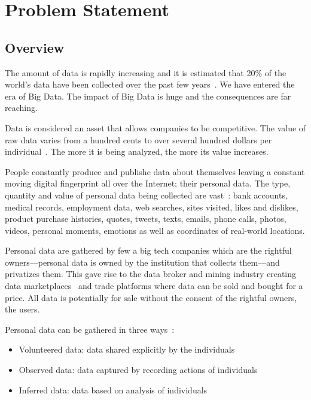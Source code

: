 \chapter{Problem Statement}
\label{problem}

\section{Overview}
\label{problem:overview}

The amount of data is rapidly increasing and it is estimated that 20\% of the world's data have been collected over the past few years~\cite{10.1109/SPW.2015.27,big_data_better_worse}. We have entered the era of Big Data. The impact of Big Data is huge and the consequences are far reaching.

Data is considered an asset that allows companies to be competitive. The value of raw data varies from a hundred cents to over several hundred dollars per individual~\cite{pr_data_cost_1, pr_data_cost_2, pr_data_cost_3}. The more it is being analyzed, the more its value increases.

People constantly produce and publishe data about themselves
leaving a constant moving digital fingerprint all over the Internet; their personal data. The type, quantity and value of personal data being collected are vast~\cite{emergence_new_assets_wef}: bank accounts, medical records, employment data, web searches, sites visited,
likes and dislikes, product purchase histories, quotes, tweets, texts, emails, phone calls, photos, videos, personal moments, emotions as well as coordinates of real-world locations.

Personal data are gathered by few a big tech companies which are the rightful owners---personal data is owned by the institution that collects them---and privatizes them. This gave rise to the data broker and mining industry creating data marketplaces~\cite{dawex, q_dx, datastreamx} and trade platforms where data can be sold and bought for a price. All data is potentially for sale without the consent of the rightful owners, the users.

Personal data can be gathered in three ways~\cite{emergence_new_assets_wef}:

\begin{itemize}
  \item Volunteered data: data shared explicitly by the individuals
  \item Observed data: data captured by recording actions of individuals
  \item Inferred data: data based on analysis of individuals
\end{itemize}

